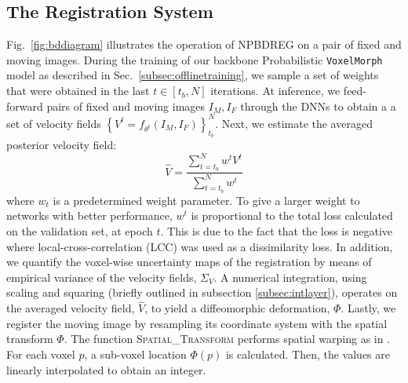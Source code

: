 \documentclass[preprint,authoryear]{elsarticle}
\begin{document}
\subsection{The Registration System}
 Fig.~\ref{fig:bddiagram} illustrates the operation of NPBDREG on a pair of fixed and moving images. During the training of our backbone Probabilistic \texttt{VoxelMorph} model \cite{dalca2018varreg} as described in Sec.~\ref{subsec:offlinetraining}, we sample a set of weights that were obtained in the last $t\in \left[t_b,N\right]$ iterations.
   At inference, we feed-forward pairs of fixed and moving images ${I_M,I_F}$ through the DNNs to obtain a a set of velocity fields $\left\{ V^{t}=f_{\theta^t}(I_M,I_F)\right\}_{t_{b}}^{N}$. %
Next, we estimate the averaged posterior velocity field:
\begin{equation}
\hat{V}=\frac{\sum_{t=t_b}^{N} w^{t}V^t}{\sum_{t=t_b}^{N} w^{t}}
\end{equation} 
where $w_{t}$ is a predetermined weight parameter. To give a larger weight to networks with better performance, $w^{t}$ is proportional to the total loss calculated on the validation set, at epoch $t$. This is due to the fact that the loss is negative where local-cross-correlation (LCC) was used as a dissimilarity loss. In addition, we quantify the voxel-wise uncertainty maps of the registration by means of empirical variance of the velocity fields, $\Sigma_V$. A numerical integration, using scaling and squaring (briefly outlined in subsection \ref{subsec:intlayer}), operates on the averaged velocity field, $\hat{V}$, to yield a diffeomorphic deformation, $\Phi$.
Lastly, we register the moving image by resampling its coordinate system with the spatial transform $\Phi$. The function \textsc{Spatial\_Transform} performs spatial warping as in \cite{dalca2018varreg}. For each voxel $p$, a sub-voxel location $\Phi(p)$ is calculated. Then, the values are linearly interpolated to obtain an integer. 
\end{document}
